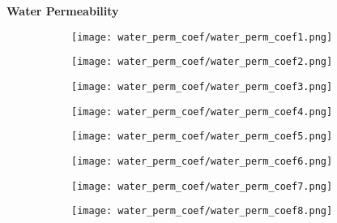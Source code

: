 \documentclass{article}
\begin{document}
    \textbf{Water Permeability}
    \begin{figure}[H]
        \centering
        \begin{subfigure}{0.48\linewidth}
		    \texttt{[image: water\_perm\_coef/water\_perm\_coef1.png]}
	    \end{subfigure}
	    \begin{subfigure}{0.48\linewidth}
		    \texttt{[image: water\_perm\_coef/water\_perm\_coef2.png]}
	    \end{subfigure}
	    \begin{subfigure}{0.48\linewidth}
		    \texttt{[image: water\_perm\_coef/water\_perm\_coef3.png]}
	    \end{subfigure}
	    \begin{subfigure}{0.48\linewidth}
		    \texttt{[image: water\_perm\_coef/water\_perm\_coef4.png]}
	    \end{subfigure}
	    \begin{subfigure}{0.48\linewidth}
		    \texttt{[image: water\_perm\_coef/water\_perm\_coef5.png]}
	    \end{subfigure}
	    \begin{subfigure}{0.48\linewidth}
		    \texttt{[image: water\_perm\_coef/water\_perm\_coef6.png]}
	    \end{subfigure}
	    \begin{subfigure}{0.48\linewidth}
		    \texttt{[image: water\_perm\_coef/water\_perm\_coef7.png]}
	    \end{subfigure}
	    \begin{subfigure}{0.48\linewidth}
		    \texttt{[image: water\_perm\_coef/water\_perm\_coef8.png]}
	    \end{subfigure}
    \end{figure}
    
    \pagebreak
    
\end{document}
